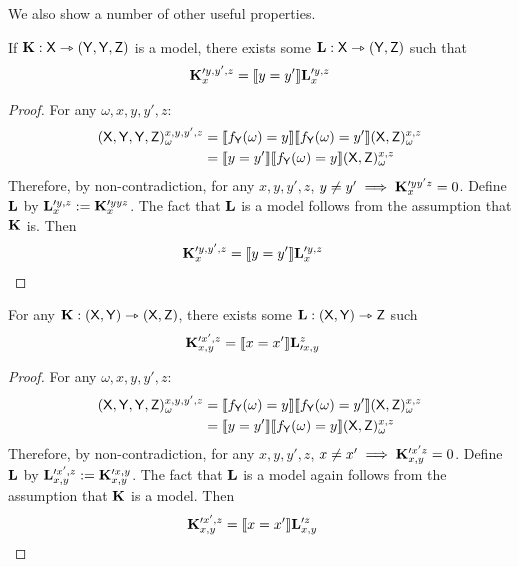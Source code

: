 We also show a number of other useful properties. 

\begin{lemma}\label{lem:nocopy1}
If $\mathbf{K}:\mathsf{X}\rightarrowtriangle (\mathsf{Y},\mathsf{Y},\mathsf{Z})$ is a model, there exists some $\mathbf{L}:\mathsf{X}\rightarrowtriangle (\mathsf{Y},\mathsf{Z})$ such that
\begin{align}
		\mathbf{K}_{x}^{\prime y,y',z} &= \llbracket y=y' \rrbracket\mathbf{L}_{x}^{\prime y,z}\\
\end{align}
\end{lemma}

\begin{proof}
For any $\omega,x,y,y',z$:
\begin{align}
	(\mathsf{X},\mathsf{Y},\mathsf{Y},\mathsf{Z})_\omega^{x,y,y',z} &= \llbracket f_{\mathsf{Y}}(\omega)=y \rrbracket \llbracket f_{\mathsf{Y}}(\omega)=y' \rrbracket (\mathsf{X},\mathsf{Z})_\omega^{x,z} \\
	&= \llbracket y=y' \rrbracket \llbracket f_{\mathsf{Y}}(\omega)=y \rrbracket(\mathsf{X},\mathsf{Z})_\omega^{x,z}
\end{align}
Therefore, by non-contradiction, for any $x,y,y',z$, $y\neq y'\implies \mathbf{K}_{x}^{\prime yy'z}=0$. Define $\mathbf{L}$ by $\mathbf{L}_x^{\prime y, z} := \mathbf{K}_x^{\prime y y z}$. The fact that $\mathbf{L}$ is a model follows from the assumption that $\mathbf{K}$ is. Then
\begin{align}
	\mathbf{K}_{x}^{\prime y,y',z} &= \llbracket y=y' \rrbracket\mathbf{L}_{x}^{\prime y,z}
\end{align}
\end{proof}


\begin{lemma}\label{lem:nocopy2}
For any $\mathbf{K}:(\mathsf{X},\mathsf{Y})\rightarrowtriangle (\mathsf{X},\mathsf{Z})$, there exists some $\mathbf{L}:(\mathsf{X},\mathsf{Y})\rightarrowtriangle \mathsf{Z}$ such
\begin{align}
	 \mathbf{K}_{x,y}^{\prime x',z} &= \llbracket x=x'\rrbracket \mathbf{L}_{\prime x,y}^{z}
\end{align}
\end{lemma}

\begin{proof}
For any $\omega,x,y,y',z$:
\begin{align}
	(\mathsf{X},\mathsf{Y},\mathsf{Y},\mathsf{Z})_\omega^{x,y,y',z} &= \llbracket f_{\mathsf{Y}}(\omega)=y \rrbracket \llbracket f_{\mathsf{Y}}(\omega)=y' \rrbracket (\mathsf{X},\mathsf{Z})_\omega^{x,z} \\
	&= \llbracket y=y' \rrbracket \llbracket f_{\mathsf{Y}}(\omega)=y \rrbracket(\mathsf{X},\mathsf{Z})_\omega^{x,z}
\end{align}
Therefore, by non-contradiction, for any $x,y,y',z$, $x\neq x'\implies \mathbf{K}_{x,y}^{\prime x'z}=0$. Define $\mathbf{L}$ by $\mathbf{L}_{x,y}^{\prime x', z} := \mathbf{K}_{x,y}^{\prime x, y}$. The fact that $\mathbf{L}$ is a model again follows from the assumption that $\mathbf{K}$ is a model. Then
\begin{align}
	\mathbf{K}_{x, y}^{\prime x', z} &= \llbracket x=x' \rrbracket\mathbf{L}_{x,y}^{\prime z}
\end{align}
\end{proof}

